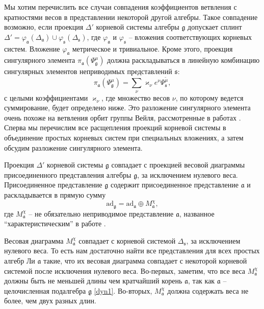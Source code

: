 \documentclass[12pt]{article}
\newcommand{\pia}{\pi_{\mathfrak{a}}}
\newcommand{\gf}{\mathfrak{g}}
\newcommand{\af}{\mathfrak{a}}
\newcommand{\sfr}{\mathfrak{s}}
\begin{document}
Мы хотим перечислить все случаи совпадения коэффициентов ветвления с кратностями весов в
представлении некоторой другой алгебры. Такое совпадение возможно, если проекция $\Delta'$ корневой
системы алгебры $\gf$ допускает сплинт $\Delta'=\varphi_{\af}(\Delta_{\af})\cup
\varphi_{\sfr}(\Delta_{\sfr})$, где  $\varphi_{\af}$ и $\varphi_{\sfr}$ -- вложения соответствующих
корневых систем. Вложение  $\varphi_{\af}$ метрическое и тривиальное. Кроме этого, проекция
сингулярного элемента  $\pia\left(\Psi^{\mu}_{\gf}\right)$ должна раскладываться в линейную
комбинацию сингулярных элементов неприводимых представлений $\sfr$:
\begin{equation}
  \label{eq:4}
  \pia\left(\Psi^{\mu}_{\gf}\right)=\sum_{\nu} \varkappa_{\nu}e^{\nu}\Psi^{\tilde\mu}_{\sfr},
\end{equation}
с целыми коэффициентами  $\varkappa_{\nu}$, где  множество весов  $\nu$, по которому ведется
суммирование, будет определено ниже. Это разложение сингулярного элемента очень похоже на ветвления
орбит группы Вейля, рассмотренные в работах  \cite{larouche2011branching,larouche2009branching}.
Сперва мы перечислим все расщепления проекций корневой системы в объединение простых корневых систем
при специальных вложениях, а затем обсудим разложение сингулярного элемента. 

Проекция  $\Delta'$ корневой системы  $\gf$ совпадает с проекцией весовой диаграммы присоединенного
представления алгебры  $\gf$, за исключением нулевого веса. Присоединенное представление  $\gf$
содержит присоединенное представление  $\af$ и раскладывается в прямую сумму
\begin{equation}
  \label{eq:3}
  \mathrm{ad}_{\gf}=\mathrm{ad}_{\af}\oplus M_{\af}^{\chi},
\end{equation}
где  $M^{\chi}_{\af}$ -- не обязательно неприводимое представление $\af$, названное 
``характеристическим'' в работе \cite{dynkin1952semisimple}. 


Весовая диаграмма $M^{\chi}_{\af}$ совпадает с корневой системой  $\Delta_{\sfr}$, за исключением
нулевого веса. То есть нам достаточно найти все представления для всех простых алгебр Ли $\af$
такие, что их весовая диаграмма совпадает с некоторой корневой системой после исключения нулевого
веса. Во-первых, заметим, что все веса  $M^{\chi}_{\af}$ должны быть  не меньшей длины чем
кратчайший корень $\af$, так как $\af$ -- целочисленная подалгебра $\gf$ \ref{dyn1}. Во-вторых,
$M^{\chi}_{\af}$ должна содержать веса не более, чем двух разных длин. 
\end{document}
